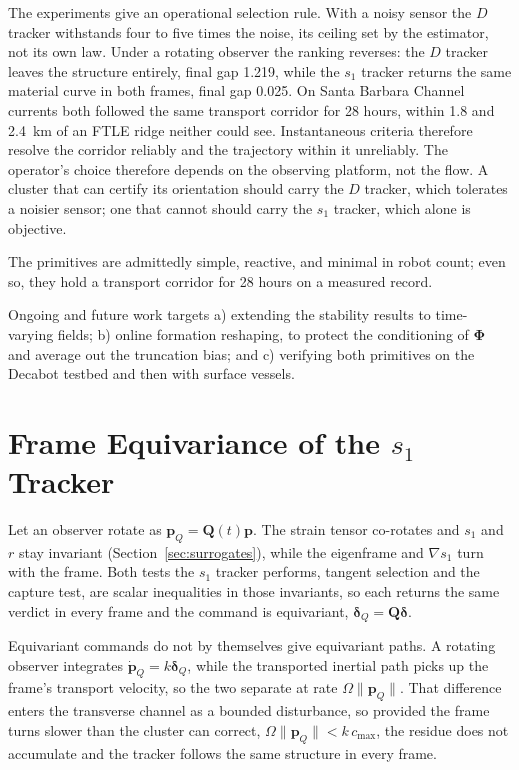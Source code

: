 \documentclass[lettersize,journal]{IEEEtran}
\begin{document}
The experiments give an operational selection rule. With a noisy sensor
the $D$ tracker withstands four to five times the noise, its ceiling set by the
estimator, not its own law. Under a rotating observer the
ranking reverses: the $D$ tracker leaves the structure entirely, final
gap 1.219, while the $s_1$ tracker returns the same material curve in
both frames, final gap 0.025. On Santa Barbara Channel currents both followed the same transport corridor for 28 hours, within 1.8 and 2.4~km of an FTLE ridge neither could see. Instantaneous criteria therefore resolve the corridor reliably and the trajectory within it unreliably. The operator's choice
therefore depends on the observing platform, not the flow. A cluster
that can certify its orientation should carry the $D$ tracker, which
tolerates a noisier sensor; one that cannot should carry the $s_1$
tracker, which alone is objective.

The primitives are admittedly simple, reactive, and minimal in robot
count; even so, they hold a transport corridor for 28 hours on a measured
record.

Ongoing and future work targets a) extending the stability results to
time-varying fields; b) online formation reshaping, to protect the
conditioning of $\boldsymbol{\Phi}$ and average out the truncation
bias; and c) verifying both primitives on the Decabot testbed and then
with surface vessels.

\appendices

\section{Frame Equivariance of the $s_1$ Tracker}
\label{app:equivariance}

Let an observer rotate as $\mathbf{p}_Q = \mathbf{Q}(t)\mathbf{p}$. The
strain tensor co-rotates and $s_1$ and $r$ stay invariant
(Section~\ref{sec:surrogates}), while the eigenframe and $\nabla s_1$
turn with the frame. Both tests the $s_1$ tracker performs, tangent
selection and the capture test, are scalar inequalities in those
invariants, so each returns the same verdict in every frame and the
command is equivariant, $\boldsymbol{\delta}_Q = \mathbf{Q}\boldsymbol{\delta}$.

Equivariant commands do not by themselves give equivariant paths. A
rotating observer integrates $\dot{\mathbf{p}}_Q = k\boldsymbol{\delta}_Q$,
while the transported inertial path picks up the frame's transport
velocity, so the two separate at rate $\Omega\lVert\mathbf{p}_Q\rVert$.
That difference enters the transverse channel as a bounded disturbance,
so provided the frame turns slower than the cluster can correct,
$\Omega\lVert\mathbf{p}_Q\rVert < k\,c_{\max}$, the residue does not
accumulate and the tracker follows the same structure in every frame.
\end{document}
